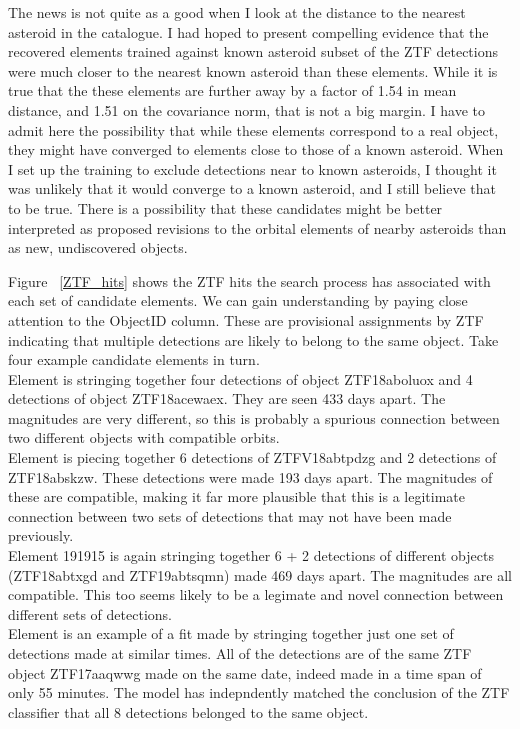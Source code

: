 The news is not quite as a good when I look at the distance to the nearest asteroid in the catalogue.
I had hoped to present compelling evidence that the recovered elements trained against
known asteroid subset of the ZTF detections were much closer to the nearest known asteroid than these elements.
While it is true that the these elements are further away by a factor of 1.54 in mean distance,
and 1.51 on the covariance norm, that is not a big margin.
I have to admit here the possibility that while these elements correspond to a real object,
they might have converged to elements close to those of a known asteroid.
When I set up the training to exclude detections near to known asteroids,
I thought it was unlikely that it would converge to a known asteroid, and I still believe that to be true.
There is a possibility that these candidates might be better interpreted as proposed revisions to the
orbital elements of nearby asteroids than as new, undiscovered objects.

Figure ~\ref{ZTF_hits} shows the ZTF hits the search process has associated with each set of candidate elements.
We can gain understanding by paying close attention to the ObjectID column.
These are provisional assignments by ZTF indicating that multiple detections are likely to belong to the same object.
Take four example candidate elements in turn.  \\
Element  is stringing together four detections of object ZTF18aboluox and 4 detections of object ZTF18acewaex.
They are seen 433 days apart.  
The magnitudes are very different, so this is probably a spurious connection between two different objects with compatible orbits.\\
Element  is piecing together 6 detections of ZTFV18abtpdzg and 2 detections of ZTF18abskzw.
These detections were made 193 days apart.
The magnitudes of these are compatible, making it far more plausible that this is a legitimate connection between 
two sets of detections that may not have been made previously. \\
Element 191915 is again stringing together 6 + 2 detections of different objects (ZTF18abtxgd and ZTF19abtsqmn)
made 469 days apart.  The magnitudes are all compatible.  
This too seems likely to be a legimate and novel connection between different sets of detections. \\
Element  is an example of a fit made by stringing together just one set of detections
made at similar times.  All of the detections are of the same ZTF object ZTF17aaqwwg made on the same date,
indeed made in a time span of only 55 minutes.
The model has indepndently matched the conclusion of the ZTF classifier that all 8 detections belonged to the same object.

